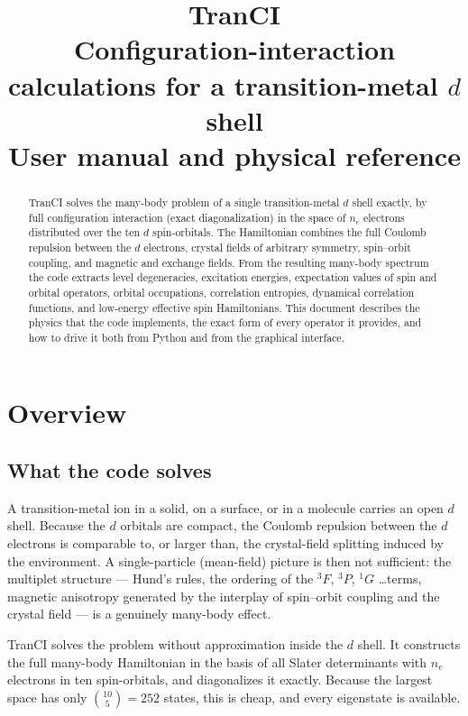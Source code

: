 \documentclass[11pt,a4paper]{article}
\title{\textbf{TranCI}\\[0.4em]
\large Configuration-interaction calculations for a transition-metal $d$ shell\\[0.6em]
\normalsize User manual and physical reference}
\author{}
\date{}
\begin{document}
\maketitle

\begin{abstract}
\noindent
TranCI solves the many-body problem of a single transition-metal $d$ shell
exactly, by full configuration interaction (exact diagonalization) in the space
of $n_e$ electrons distributed over the ten $d$ spin-orbitals.  The Hamiltonian
combines the full Coulomb repulsion between the $d$ electrons, crystal fields of
arbitrary symmetry, spin--orbit coupling, and magnetic and exchange fields.
From the resulting many-body spectrum the code extracts level degeneracies,
excitation energies, expectation values of spin and orbital operators, orbital
occupations, correlation entropies, dynamical correlation functions, and
low-energy effective spin Hamiltonians.  This document describes the physics
that the code implements, the exact form of every operator it provides, and how
to drive it both from Python and from the graphical interface.
\end{abstract}

\tableofcontents
\newpage

\section{Overview}

\subsection{What the code solves}

A transition-metal ion in a solid, on a surface, or in a molecule carries an
open $d$ shell.  Because the $d$ orbitals are compact, the Coulomb repulsion
between the $d$ electrons is comparable to, or larger than, the crystal-field
splitting induced by the environment.  A single-particle (mean-field) picture is
then not sufficient: the multiplet structure --- Hund's rules, the ordering of
the $^3F$, $^3P$, $^1G$ \ldots terms, magnetic anisotropy generated by the
interplay of spin--orbit coupling and the crystal field --- is a genuinely
many-body effect.

TranCI solves the problem without approximation inside the $d$ shell.  It
constructs the full many-body Hamiltonian in the basis of all Slater
determinants with $n_e$ electrons in ten spin-orbitals, and diagonalizes it
exactly.  Because the largest space has only $\binom{10}{5}=252$ states, this is
cheap, and every eigenstate is available.
\end{document}
